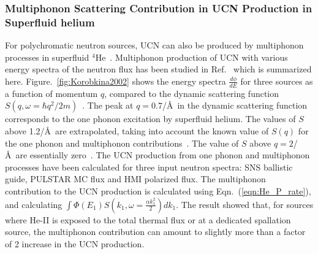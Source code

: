 

 \subsubsection{Multiphonon Scattering Contribution in UCN Production
   in Superfluid helium}
 For polychromatic neutron sources, UCN can also be produced by
 multiphonon processes in superfluid
 $^4$He~\cite{Korobkina2002,Schmidt2009}. Multiphonon production of
 UCN with various energy spectra of the neutron flux has been studied
 in Ref.~\cite{Korobkina2002} which is summarized
 here. Figure.~\ref{fig:Korobkina2002} shows the energy spectra
 $\frac{d\phi}{dE}$ for three sources as a function of momentum $q$,
 compared to the dynamic scattering function
 $S(q,\omega=\hbar q^2/2m)$~\cite{Korobkina2002}.
 The peak at $q=0.7$/\AA~in the dynamic scattering function
 corresponds to the one phonon excitation by superfluid helium. The
 values of $S$ above 1.2/\AA~are extrapolated, taking into account the
 known value of $S(q)$ for the one phonon and multiphonon
 contributions~\cite{Korobkina2002}. The value of $S$ above
 $q=2$/\AA~are essentially zero~\cite{Korobkina2002}.  The UCN
 production from one phonon and multiphonon processes have been
 calculated for three input neutron spectra: SNS ballistic guide,
 PULSTAR MC flux and HMI polarized flux.  The multiphonon contribution
 to the UCN production is calculated using Eqn.~(\ref{eqn:He_P_rate}),
 and calculating
 $\int \Phi(E_1)S(k_1,\omega=\frac{\alpha k_1^2}{2}) dk_1$.  The
 result showed that, for sources where He-II is exposed to the total
 thermal flux or at a dedicated spallation source, the multiphonon
 contribution can amount to slightly more than a factor of 2 increase
 in the UCN production.




